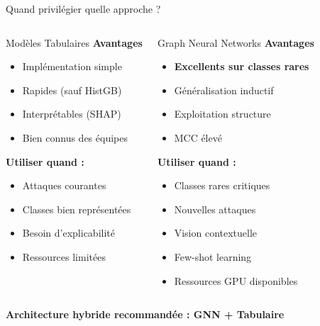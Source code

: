 ﻿\documentclass[aspectratio=169]{beamer}
\begin{document}
\begin{frame}{Quand privilégier quelle approche ?}
\begin{columns}[T]
\begin{block}{Modèles Tabulaires}
\textbf{Avantages}
\begin{itemize}
    \item Implémentation simple
    \item Rapides (sauf HistGB)
    \item Interprétables (SHAP)
    \item Bien connus des équipes
\end{itemize}

\vspace{0.3cm}
\textbf{Utiliser quand :}
\begin{itemize}
    \item Attaques courantes
    \item Classes bien représentées
    \item Besoin d'explicabilité
    \item Ressources limitées
\end{itemize}
\end{block}

\begin{block}{Graph Neural Networks}
\textbf{Avantages}
\begin{itemize}
    \item \textcolor{accentorange}{\textbf{Excellents sur classes rares}}
    \item Généralisation inductif
    \item Exploitation structure
    \item MCC élevé
\end{itemize}

\vspace{0.3cm}
\textbf{Utiliser quand :}
\begin{itemize}
    \item Classes rares critiques
    \item Nouvelles attaques
    \item Vision contextuelle
    \item Few-shot learning
    \item Ressources GPU disponibles
\end{itemize}
\end{block}
\end{columns}

\vspace{0.5cm}
\centering
\textbf{\textcolor{accentorange}{Architecture hybride recommandée : GNN + Tabulaire}}
\end{frame}
\end{document}
